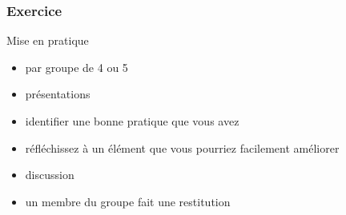 \begin{frame}
  \frametitle{Exercice}

\begin{block}{Mise en pratique }
\begin{itemize}
\item par groupe de 4 ou 5 
\item présentations
\item identifier une bonne pratique que vous avez 
\item réfléchissez à un élément que vous pourriez facilement améliorer
\item discussion 
\item un membre du groupe fait une restitution 
\end{itemize}
\end{block}
\end{frame}

